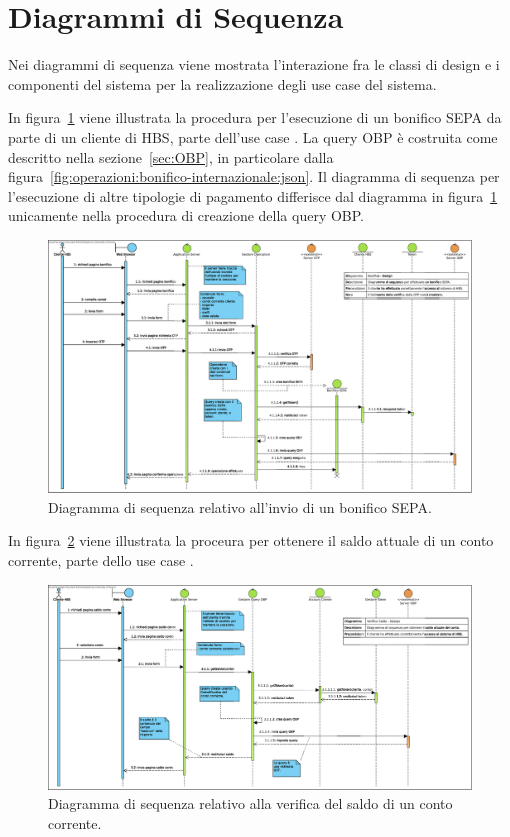 
\section{Diagrammi di Sequenza}

Nei diagrammi di sequenza viene mostrata l'interazione fra le classi di design e i componenti del sistema per la realizzazione degli use case del sistema.

In figura~\ref{fig:sequenza:bonifico-sepa} viene illustrata la procedura per l'esecuzione di un bonifico SEPA da parte di un cliente di HBS, parte dell'use case \iducDISPAG.
La query OBP \`e costruita come descritto nella sezione~\ref{sec:OBP}, in particolare dalla figura~\ref{fig:operazioni:bonifico-internazionale:json}.
Il diagramma di sequenza per l'esecuzione di altre tipologie di pagamento differisce dal diagramma in figura~\ref{fig:sequenza:bonifico-sepa} unicamente nella procedura di creazione della query OBP.

\begin{figure}[h]
    \centering
	\includegraphics[width=\textheight, angle=90]{Images/Bonifico_-_Design.eps}
    \caption{Diagramma di sequenza relativo all'invio di un bonifico SEPA.}
    \label{fig:sequenza:bonifico-sepa}
\end{figure}

In figura~\ref{fig:sequenza:saldo} viene illustrata la proceura per ottenere il saldo attuale di un conto corrente, parte dello use case \iducVERSAL.

\begin{figure}[h]
    \centering
	\includegraphics[width=\textheight, angle=90]{Images/Verifica_Saldo_-_Design.eps}
    \caption{Diagramma di sequenza relativo alla verifica del saldo di un conto corrente.}
    \label{fig:sequenza:saldo}
\end{figure}

